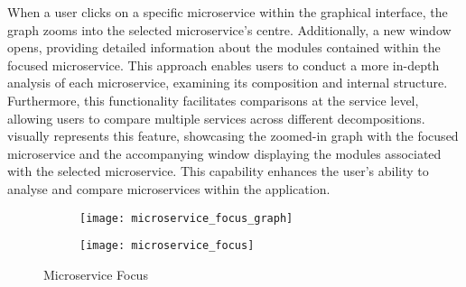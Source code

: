 When a user clicks on a specific microservice within the graphical interface,
the graph zooms into the selected microservice's centre. Additionally, a new
window opens, providing detailed information about the modules contained within
the focused microservice. This approach enables users to conduct a more
in-depth analysis of each microservice, examining its composition and internal
structure. Furthermore, this functionality facilitates comparisons at the
service level, allowing users to compare multiple services across different
decompositions.  visually represents this feature,
showcasing the zoomed-in graph with the focused microservice and the
accompanying window displaying the modules associated with the selected
microservice. This capability enhances the user's ability to analyse and
compare microservices within the application.

\begin{figure*}[!htb]
  \centering
  \begin{subfigure}[!htb]{0.49\textwidth}
    \centering
    \texttt{[image: microservice\_focus\_graph]}
  \end{subfigure}
  \hfill
  \begin{subfigure}[!htb]{0.49\textwidth}
    \centering
    \texttt{[image: microservice\_focus]}
  \end{subfigure}
  \caption{Microservice Focus}
  \label{fig:microservice_focus}
\end{figure*}
